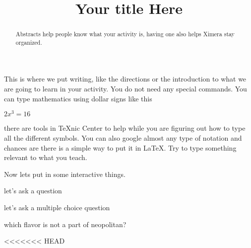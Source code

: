 \documentclass{ximera}%
\title{Your title Here}%
\begin{document}
\begin{abstract}
Abstracts help people know what your activity is, having one also helps Ximera stay organized.
\end{abstract}
\maketitle %
This is where we put writing, like the directions or the introduction to what we are going to learn in your activity. You do not need any special commands. You can type mathematics using dollar signs like this
 
$2x^3=16$

there are tools in TeXnic Center to help while you are figuring out how to type all the different symbols. You can also google almost any type of notation and chances are there is a simple way to put it in LaTeX. Try to type something relevant to what you teach.

Now lets put in some interactive things.

let's ask a question


let's ask a multiple choice question
\begin{question} which flavor is not a part of neopolitan?
\begin{multipleChoice}
\end{multipleChoice}
\end{question}
<<<<<<< HEAD
\end{document}
